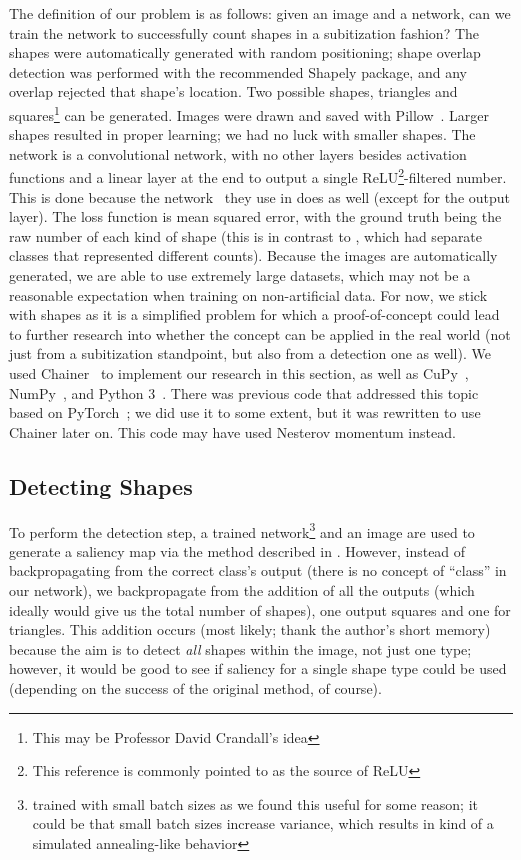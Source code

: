The definition of our problem is as follows: given an image and a network, can we train the network
to successfully count shapes in a subitization fashion? The shapes were automatically generated with
random positioning; shape overlap detection was performed with the recommended\cite{viaforshapely}
Shapely\cite{shapely} package, and any overlap rejected that shape's location. Two possible shapes,
triangles and squares\footnote{This may be Professor David Crandall's idea} can be generated. Images
were drawn and saved with Pillow~\cite{imagesinpython}. Larger shapes resulted in proper learning;
we had no luck with smaller shapes. The network is a convolutional network, with no other layers
besides activation functions and a linear layer at the end to output a single
ReLU\cite{pmlr-v15-glorot11a}\footnote{This reference is commonly pointed to as the source of
ReLU}-filtered number. This is done because the network~\cite{szegedy2014going} they use in
\cite{10.1007/978-3-319-46487-9_48} does as well (except for the output layer). The loss function is
mean squared error, with the ground truth being the raw number of each kind of shape (this is in
contrast to \cite{Zhang_2015_CVPR}, which had separate classes that represented different counts).
Because the images are automatically generated, we are able to use extremely large datasets, which
may not be a reasonable expectation when training on non-artificial data. For now, we stick with
shapes as it is a simplified problem for which a proof-of-concept could lead to further research
into whether the concept can be applied in the real world (not just from a subitization standpoint,
but also from a detection one as well). We used Chainer~\cite{tokui2019chainer} to implement our
research in this section, as well as CuPy~\cite{cupy_learningsys2017}, NumPy~\cite{2020NumPy-Array},
and Python 3~\cite{language}. There was previous code that addressed this topic based on
PyTorch~\cite{NEURIPS2019_9015}; we did use it to some extent, but it was rewritten to use Chainer
later on. This code may have used Nesterov momentum instead.

\subsection{Detecting Shapes}
\label{detectingshapes}

To perform the detection step, a trained network\footnote{trained with small batch sizes as we found
this useful for some reason; it could be that small batch sizes increase variance, which results in
kind of a simulated annealing-like behavior} and an image are used to generate a saliency map via
the method described in \cite{simonyan2014deep}. However, instead of backpropagating from the
correct class's output (there is no concept of ``class'' in our network), we backpropagate from the
addition of all the outputs (which ideally would give us the total number of shapes), one output
squares and one for triangles. This addition occurs (most likely; thank the author's short memory)
because the aim is to detect \textit{all} shapes within the image, not just one type; however, it
would be good to see if saliency for a single shape type could be used (depending on the success of
the original method, of course).

